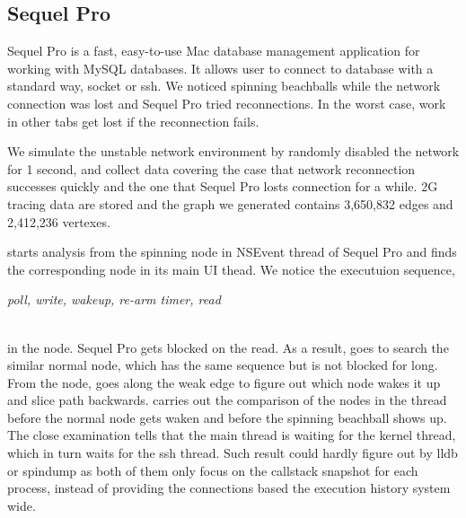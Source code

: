 \subsection{Sequel Pro}

Sequel Pro is a fast, easy-to-use Mac database management application for
working with MySQL databases. It allows user to connect to database with a
standard way, socket or ssh. We noticed spinning beachballs while the network
connection was lost and Sequel Pro tried reconnections. In the worst case, work
in other tabs get lost if the reconnection fails.

We simulate the unstable network environment by randomly disabled the network
for 1 second, and collect data covering the case that network reconnection
successes quickly and the one that Sequel Pro losts connection for a while. 2G
tracing data are stored and the graph we generated contains 3,650,832 edges and
2,412,236 vertexes.

\xxx starts analysis from the spinning node in NSEvent thread of Sequel Pro and
finds the corresponding node in its main UI thead. We notice the executuion
sequence,\\ \centerline{\textit{poll, write, wakeup, re-arm timer, read}} \\
in the node. Sequel Pro gets blocked on the read. As a result, \xxx goes to
search the similar normal node, which has the same sequence but is not blocked
for long. From the node, \xxx goes along the weak edge to figure out which node
wakes it up and slice path backwards. \xxx carries out the comparison of the
nodes in the thread before the normal node gets waken and before the spinning
beachball shows up. The close examination tells that the main thread is waiting
for the kernel thread, which in turn waits for the ssh thread. Such result
could hardly figure out by lldb or spindump as both of them only focus on the
callstack snapshot for each process, instead of providing the connections based
the execution history system wide.
